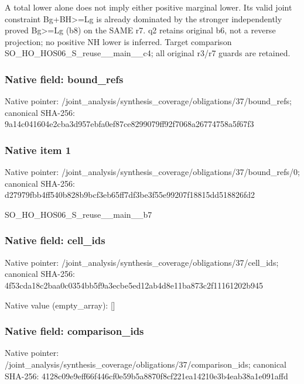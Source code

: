 \documentclass[10pt,a4paper]{article}
\begin{document}
\begingroup\raggedright\sloppy A total lower alone does not imply either positive marginal lower. Its valid joint constraint Bg+BH>=\allowbreak{}Lg is already dominated by the stronger independently proved Bg>=\allowbreak{}Lg (b8) on the SAME r7. q2 retains original b6,\allowbreak{} not a reverse projection;\allowbreak{} no positive NH lower is inferred. Target comparison SO\_\allowbreak{}HO\_\allowbreak{}HOS06\_\allowbreak{}S\_\allowbreak{}reuse\_\allowbreak{}\_\allowbreak{}main\_\allowbreak{}\_\allowbreak{}c4;\allowbreak{} all original r3/\allowbreak{}r7 guards are retained.\par\endgroup

\subsubsection{Native field: bound\_\allowbreak{}refs}
Native pointer: /joint\_\allowbreak{}analysis/synthesis\_\allowbreak{}coverage/obligations/37/bound\_\allowbreak{}refs; canonical SHA-256: 9a14c041604e2cba3d957ebfa0ef87ce8299079ff92f7068a26774758a5f67f3

\subsubsection{Native item 1}
Native pointer: /joint\_\allowbreak{}analysis/synthesis\_\allowbreak{}coverage/obligations/37/bound\_\allowbreak{}refs/0; canonical SHA-256: d27979fbb4ff540b828b9bcf3eb65ff7df3be3f55e99207f18815dd518826fd2

\begingroup\raggedright\sloppy SO\_\allowbreak{}HO\_\allowbreak{}HOS06\_\allowbreak{}S\_\allowbreak{}reuse\_\allowbreak{}\_\allowbreak{}main\_\allowbreak{}\_\allowbreak{}b7\par\endgroup

\subsubsection{Native field: cell\_\allowbreak{}ids}
Native pointer: /joint\_\allowbreak{}analysis/synthesis\_\allowbreak{}coverage/obligations/37/cell\_\allowbreak{}ids; canonical SHA-256: 4f53cda18c2baa0c0354bb5f9a3ecbe5ed12ab4d8e11ba873c2f11161202b945

Native value (empty\_\allowbreak{}array): []

\subsubsection{Native field: comparison\_\allowbreak{}ids}
Native pointer: /joint\_\allowbreak{}analysis/synthesis\_\allowbreak{}coverage/obligations/37/comparison\_\allowbreak{}ids; canonical SHA-256: 4128c09e9eff66f446cf0e59b5a8870f8cf221ea14210e3b4eab38a1e091affd
\end{document}
